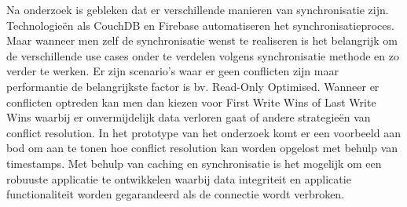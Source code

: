 Na onderzoek is gebleken dat er verschillende manieren van synchronisatie zijn. Technologie\"en als CouchDB en Firebase automatiseren het synchronisatieproces. Maar wanneer men zelf de synchronisatie wenst te realiseren is het belangrijk om de verschillende use cases onder te verdelen volgens synchronisatie methode en zo verder te werken. Er zijn scenario's waar er geen conflicten zijn maar performantie de belangrijkste factor is bv. Read-Only Optimised. Wanneer er conflicten optreden kan men dan kiezen voor First Write Wins of Last Write Wins waarbij er onvermijdelijk data verloren gaat of andere strategie\"en van conflict resolution. In het prototype van het onderzoek komt er een voorbeeld aan bod om aan te tonen hoe conflict resolution kan worden opgelost met behulp van timestamps. Met behulp van caching en synchronisatie is het mogelijk om een robuuste applicatie te ontwikkelen waarbij data integriteit en applicatie functionaliteit worden gegarandeerd als de connectie wordt verbroken.